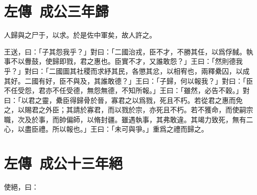 \theendnotes 

\section[楚歸晉知罃\quad{\small 左傳 成公三年}]{{\normalsize 左傳\ 成公三年}\quad {}歸}
人歸與之尸于，以求。於是佐中軍矣，故人許之。

王送，曰：「子其怨我乎？」對曰：「二國治戎，臣不才，不勝其任，以爲俘馘。執事不以釁鼓，使歸即戮，君之惠也。臣實不才，又誰敢怨？」王曰：「然則德我乎？」對曰：「二國圖其社稷而求紓其民，各懲其忿，以相宥也，兩釋纍囚，以成其好。二國有好，臣不與及，其誰敢德？」王曰：「子歸，何以報我？」對曰：「臣不任受怨，君亦不任受德，無怨無德，不知所報。」王曰：「雖然，必告不穀。」對曰：「以君之靈，纍臣得歸骨於晉，寡君之以爲戮，死且不朽。若從君之惠而免之，以賜君之外臣；其請於寡君，而以戮於宗，亦死且不朽。若不獲命，而使嗣宗職，次及於事，而帥偏師，以脩封疆。雖遇執事，其弗敢違。其竭力致死，無有二心，以盡臣禮。所以報也。」王曰：「未可與爭。」重爲之禮而歸之。

\section[呂相絕秦\quad{\small 左傳 成公十三年}]{{\normalsize 左傳\ 成公十三年}\quad {}絕}
使絕，曰：

